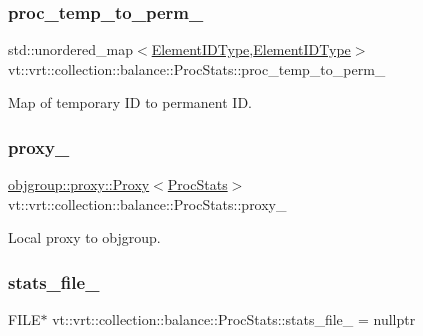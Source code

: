 \subsubsection{\texorpdfstring{proc\+\_\+temp\+\_\+to\+\_\+perm\+\_\+}{proc\_temp\_to\_perm\_}}
{\footnotesize\ttfamily std\+::unordered\+\_\+map$<$\hyperlink{namespacevt_1_1vrt_1_1collection_1_1balance_a14c8d2c972f2913aa3f1636e5be0a120}{Element\+I\+D\+Type},\hyperlink{namespacevt_1_1vrt_1_1collection_1_1balance_a14c8d2c972f2913aa3f1636e5be0a120}{Element\+I\+D\+Type}$>$ vt\+::vrt\+::collection\+::balance\+::\+Proc\+Stats\+::proc\+\_\+temp\+\_\+to\+\_\+perm\+\_\+\hspace{0.3cm}{\ttfamily [private]}}



Map of temporary ID to permanent ID. 

\mbox{\label{structvt_1_1vrt_1_1collection_1_1balance_1_1_proc_stats_a117dfc074ac943a1a8493f150ff35a00}} 
\subsubsection{\texorpdfstring{proxy\+\_\+}{proxy\_}}
{\footnotesize\ttfamily \hyperlink{structvt_1_1objgroup_1_1proxy_1_1_proxy}{objgroup\+::proxy\+::\+Proxy}$<$\hyperlink{structvt_1_1vrt_1_1collection_1_1balance_1_1_proc_stats}{Proc\+Stats}$>$ vt\+::vrt\+::collection\+::balance\+::\+Proc\+Stats\+::proxy\+\_\+\hspace{0.3cm}{\ttfamily [private]}}



Local proxy to objgroup. 

\mbox{\label{structvt_1_1vrt_1_1collection_1_1balance_1_1_proc_stats_a7c1a0cd0d083053cc4670873bc4f6ef1}} 
\subsubsection{\texorpdfstring{stats\+\_\+file\+\_\+}{stats\_file\_}}
{\footnotesize\ttfamily F\+I\+LE$\ast$ vt\+::vrt\+::collection\+::balance\+::\+Proc\+Stats\+::stats\+\_\+file\+\_\+ = nullptr\hspace{0.3cm}{\ttfamily [private]}}



